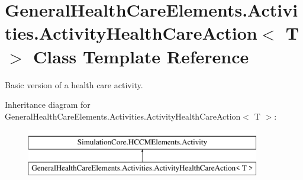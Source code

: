\hypertarget{class_general_health_care_elements_1_1_activities_1_1_activity_health_care_action}{}\section{General\+Health\+Care\+Elements.\+Activities.\+Activity\+Health\+Care\+Action$<$ T $>$ Class Template Reference}
\label{class_general_health_care_elements_1_1_activities_1_1_activity_health_care_action}


Basic version of a health care activity.  


Inheritance diagram for General\+Health\+Care\+Elements.\+Activities.\+Activity\+Health\+Care\+Action$<$ T $>$\+:\begin{figure}[H]
\begin{center}
\leavevmode
\includegraphics[height=2.000000cm]{class_general_health_care_elements_1_1_activities_1_1_activity_health_care_action}
\end{center}
\end{figure}
